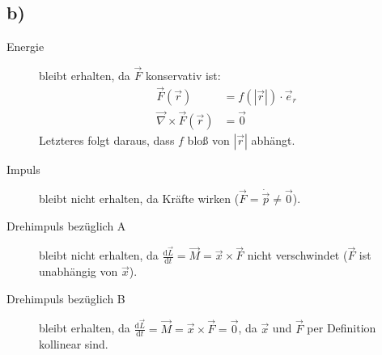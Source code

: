 \documentclass[12pt,a4paper,notitlepage]{article}
\newcommand{\diff}{\mathrm{d}}
\begin{document}
\subsection*{b)}
\begin{description}
\item[Energie] bleibt erhalten, da $\vec F$ konservativ ist:
\begin{align}
\vec F(\vec r)&=f\left(\left|\vec r\right|\right)\cdot\vec e_r\\
\vec\nabla\times\vec F\left(\vec r\right)&=\vec 0
\end{align}
Letzteres folgt daraus, dass $f$ bloß von $\left|\vec r\right|$ abhängt.
\item[Impuls] bleibt nicht erhalten, da Kräfte wirken ($\vec F=\dot\vec p\neq\vec 0$).
\item[Drehimpuls bezüglich A] bleibt nicht erhalten, da $\frac{\diff\vec L}{\diff t}=\vec M=\vec x\times\vec F$ nicht verschwindet ($\vec F$ ist unabhängig von $\vec x$).
\item[Drehimpuls bezüglich B] bleibt erhalten, da $\frac{\diff\vec L}{\diff t}=\vec M=\vec x\times\vec F=\vec 0$, da $\vec x$ und $\vec F$ per Definition kollinear sind.
\end{description}
\end{document}
